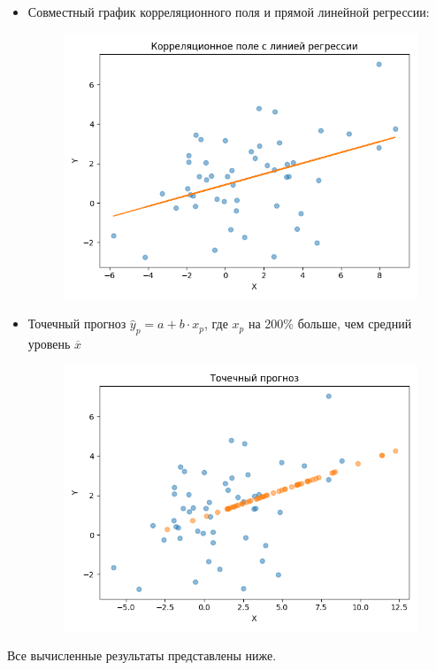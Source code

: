 \begin{itemize}
	\item Совместный график корреляционного поля и прямой линейной регрессии:
	
	\begin{figure}[H]
		\begin{minipage}[H]{0.95\linewidth}
			\begin{center}
				\includegraphics[width=\linewidth]{figures/cor_field_with_reg}
			\end{center}
		\end{minipage}
	\end{figure}

	\item Точечный прогноз $\hat{y}_p = a + b \cdot x_p$, где $x_p$ на 200\% больше, чем средний уровень $\overline{x}$
	
	\begin{figure}[H]
		\begin{minipage}[H]{0.95\linewidth}
			\begin{center}
				\includegraphics[width=\linewidth]{figures/predict}
			\end{center}
		\end{minipage}
	\end{figure}
	
\end{itemize}

Все вычисленные результаты представлены ниже.

